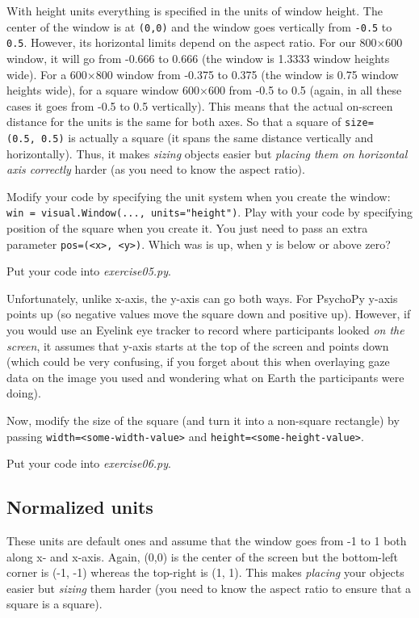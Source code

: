 \documentclass[
]{book}
\begin{document}
With height units everything is specified in the units of window height. The center of the window is at \texttt{(0,0)} and the window goes vertically from \texttt{-0.5} to \texttt{0.5}. However, its horizontal limits depend on the aspect ratio. For our 800×600 window, it will go from -0.666 to 0.666 (the window is 1.3333 window heights wide). For a 600×800 window from -0.375 to 0.375 (the window is 0.75 window heights wide), for a square window 600×600 from -0.5 to 0.5 (again, in all these cases it goes from -0.5 to 0.5 vertically). This means that the actual on-screen distance for the units is the same for both axes. So that a square of \texttt{size=(0.5,\ 0.5)} is actually a square (it spans the same distance vertically and horizontally). Thus, it makes \emph{sizing} objects easier but \emph{placing them on horizontal axis correctly} harder (as you need to know the aspect ratio).

Modify your code by specifying the unit system when you create the window: \texttt{win\ =\ visual.Window(...,\ units="height")}. Play with your code by specifying position of the square when you create it. You just need to pass an extra parameter \texttt{pos=(\textless{}x\textgreater{},\ \textless{}y\textgreater{})}. Which was is up, when y is below or above zero?

Put your code into \emph{exercise05.py}.

Unfortunately, unlike x-axis, the y-axis can go both ways. For PsychoPy y-axis points up (so negative values move the square down and positive up). However, if you would use an Eyelink eye tracker to record where participants looked \emph{on the screen}, it assumes that y-axis starts at the top of the screen and points down (which could be very confusing, if you forget about this when overlaying gaze data on the image you used and wondering what on Earth the participants were doing).

Now, modify the size of the square (and turn it into a non-square rectangle) by passing \texttt{width=\textless{}some-width-value\textgreater{}} and \texttt{height=\textless{}some-height-value\textgreater{}}.

Put your code into \emph{exercise06.py}.

\hypertarget{normalized-units}{%
\subsection{Normalized units}\label{normalized-units}}

These units are default ones and assume that the window goes from -1 to 1 both along x- and x-axis. Again, (0,0) is the center of the screen but the bottom-left corner is (-1, -1) whereas the top-right is (1, 1). This makes \emph{placing} your objects easier but \emph{sizing} them harder (you need to know the aspect ratio to ensure that a square is a square).
\end{document}
